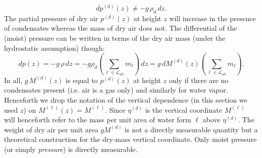 \documentclass{agujournal}
\begin{document}
{\begin{equation}
dp^{(d)}(z)\ne -g\, \rho_d\, dz.
\end{equation}
The partial pressure of dry air $p^{(d)}(z)$ at height $z$ will increase in the presence of condensates whereas the mass of dry air does not. The differential of the (moist) pressure can be written in terms of the dry air mass (under the hydrostatic assumption) though:
\begin{equation}
dp(z)=-g\, \rho \, dz = -g\rho_d \left( \sum_{\ell \in \mathcal{L}_{all}} m_\ell\right)\, dz = g\, dM^{(d)}(z)\left( \sum_{\ell \in \mathcal{L}_{all}} m_\ell\right).
\end{equation}
In all, $g\, M^{(d)}(z)$ is equal to $p^{(d)}(z)$ at height $z$ only if there are no condensates present (i.e. air is a gas only) and similarly for water vapor. Henceforth we drop the notation of the vertical dependence (in this section we used $z$) on $M^{(\ell)}(z)=M^{(\ell)}$. Since $\eta^{(d)}$ is the vertical coordinate $M^{(\ell)}$ will henceforth refer to the mass per unit area of  water form $\ell$ above $\eta^{(d)}$. The weight of dry air per unit area $g M^{(d)}$ is not a directly measurable quantity but a theoretical construction for the dry-mass vertical coordinate. Only moist pressure (or simply {\em{pressure}}) is directly measurable.

%
}
\end{document}
